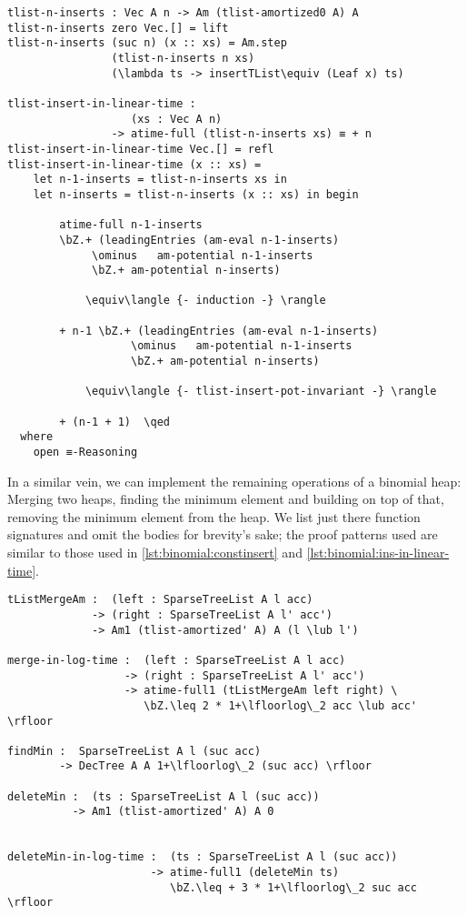 \begin{lstlisting}[caption={$n$ inserts in linear time},label={lst:binomial:ins-in-linear-time},emph={tlist,insert,inserts,n,in,linear,time,insertTList,am,leadingEntries,potential}]
tlist-n-inserts : Vec A n -> Am (tlist-amortized0 A) A
tlist-n-inserts zero Vec.[] = lift
tlist-n-inserts (suc n) (x :: xs) = Am.step
                (tlist-n-inserts n xs)
                (\lambda ts -> insertTList\equiv (Leaf x) ts)

tlist-insert-in-linear-time :
                   (xs : Vec A n)
                -> atime-full (tlist-n-inserts xs) ≡ + n
tlist-insert-in-linear-time Vec.[] = refl
tlist-insert-in-linear-time (x :: xs) =
    let n-1-inserts = tlist-n-inserts xs in
    let n-inserts = tlist-n-inserts (x :: xs) in begin

        atime-full n-1-inserts
        \bZ.+ (leadingEntries (am-eval n-1-inserts)
             \ominus   am-potential n-1-inserts
             \bZ.+ am-potential n-inserts)

            \equiv\langle {- induction -} \rangle

        + n-1 \bZ.+ (leadingEntries (am-eval n-1-inserts)
                   \ominus   am-potential n-1-inserts
                   \bZ.+ am-potential n-inserts)

            \equiv\langle {- tlist-insert-pot-invariant -} \rangle

        + (n-1 + 1)  \qed
  where
    open ≡-Reasoning
\end{lstlisting}

In a similar vein, we can implement the remaining operations of a binomial heap: Merging two heaps, finding the minimum element and building on top of that, removing the minimum element from the heap. We list just there function signatures and omit the bodies for brevity's sake; the proof patterns used are similar to those used in \autoref{lst:binomial:constinsert} and \autoref{lst:binomial:ins-in-linear-time}.

\begin{lstlisting}[caption={Remaining heap operations},label={lst:binomial:remaining},emph={SparseTreeList,tListMergeAm,merge,in,log,time,findMin,deleteMin}]
tListMergeAm :  (left : SparseTreeList A l acc)
             -> (right : SparseTreeList A l' acc')
             -> Am1 (tlist-amortized' A) A (l \lub l')

merge-in-log-time :  (left : SparseTreeList A l acc)
                  -> (right : SparseTreeList A l' acc')
                  -> atime-full1 (tListMergeAm left right) \
                     \bZ.\leq 2 * 1+\lfloorlog\_2 acc \lub acc' \rfloor

findMin :  SparseTreeList A l (suc acc)
        -> DecTree A A 1+\lfloorlog\_2 (suc acc) \rfloor

deleteMin :  (ts : SparseTreeList A l (suc acc))
          -> Am1 (tlist-amortized' A) A 0


deleteMin-in-log-time :  (ts : SparseTreeList A l (suc acc))
                      -> atime-full1 (deleteMin ts)
                         \bZ.\leq + 3 * 1+\lfloorlog\_2 suc acc \rfloor

\end{lstlisting}